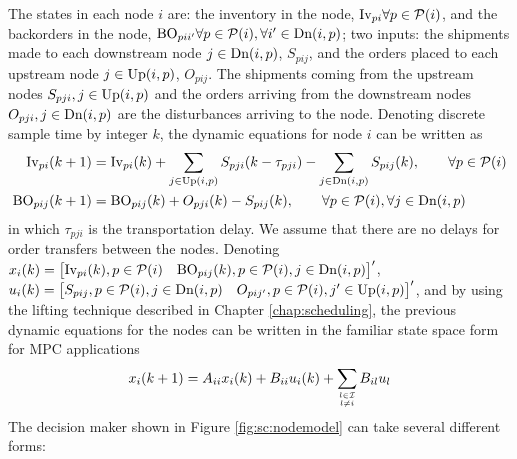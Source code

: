 The states in each node $i$ are:  the inventory in the node,
$\textrm{Iv}_{pi} \forall p \in \mathcal{P}(i)$, and the backorders in the
node, $\textrm{BO}_{pii'} \forall p \in \mathcal{P}(i), \forall i' \in \textrm{Dn}(i,p)$; two inputs:
the shipments made to each downstream node $j \in \textrm{Dn}(i,p)$, $S_{pij}$, and
the orders placed to each upstream node $j \in \textrm{Up}(i,p)$, $O_{pij}$. The
shipments coming from the upstream nodes $S_{pji}, j \in \textrm{Up}(i,p)$ and
the orders arriving from the downstream nodes $O_{pji}, j \in \textrm{Dn}(i,p)$
are the disturbances arriving to the node. Denoting discrete sample time by
integer $k$, the dynamic equations for node $i$ can be written as
\begin{align}
\textrm{Iv}_{pi}(k+1) &= \textrm{Iv}_{pi}(k) + \sum_{j \in \textrm{Up}(i,p)}S_{pji}(k-\tau_{pji})
-\sum_{j \in \textrm{Dn}(i,p)}S_{pij}(k), \qquad \forall p \in \mathcal{P}(i)  \label{eq:sc:inventorybalance} \\
\textrm{BO}_{pij}(k+1) &= \textrm{BO}_{pij}(k) + O_{pji}(k) -S_{pij}(k),\qquad \forall
p \in \mathcal{P}(i), \forall j \in \textrm{Dn}(i,p)
\label{eq:sc:backorderbalance}
\end{align}
in which $\tau_{pji}$ is the transportation delay. We assume that there
are no delays for order transfers between the nodes.
Denoting $x_i(k) = \begin{bmatrix}\textrm{Iv}_{pi}(k), p \in \mathcal{P}(i)  & \textrm{BO}_{pij}(k),
   p \in \mathcal{P}(i),  j \in \textrm{Dn}(i,p)\end{bmatrix}'$,
$u_i(k) = \begin{bmatrix}S_{pij}, p \in \mathcal{P}(i), j \in \textrm{Dn}(i,p)&
  O_{pij'}, p \in \mathcal{P}(i),j' \in \textrm{Up}(i,p)\end{bmatrix}'$, and
by using the lifting technique described in Chapter \ref{chap:scheduling},
the previous dynamic equations for the nodes
can be written in the familiar state space form for MPC applications 
\begin{equation}
x_i(k+1) = A_{ii}x_i(k) + B_{ii}u_i(k)+ \sum_{l\in\mathcal{I} \atop l \neq i}B_{il}u_l
\end{equation}
The decision maker shown in Figure \ref{fig:sc:nodemodel} can take
several different forms:
